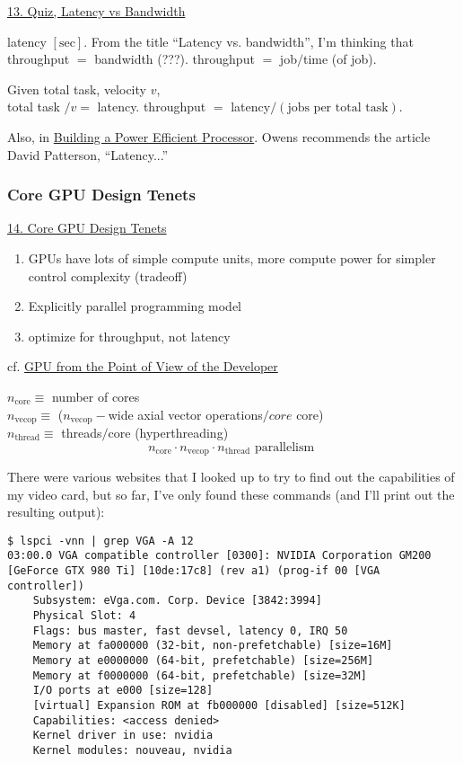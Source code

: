 \documentclass[10pt]{amsart}
\begin{document}
\begin{multicols*}{2}
\href{https://classroom.udacity.com/courses/cs344/lessons/55120467/concepts/667559300923}{13. Quiz, Latency vs Bandwidth}

latency $[\text{sec}]$.  From the title ``Latency vs. bandwidth'', I'm thinking that throughput $=$ bandwidth (???).  throughput $ = $ job$/$time (of job).  

Given total task, velocity $v$, \\
total task $/v = $ latency.  throughput $=$ latency$/(\text{jobs per total task})$.  


Also, in \href{https://classroom.udacity.com/courses/cs344/lessons/55120467/concepts/669874580923}{Building a Power Efficient Processor}.  Owens recommends the article David Patterson, ``Latency...''

\subsubsection{Core GPU Design Tenets}

\href{https://classroom.udacity.com/courses/cs344/lessons/55120467/concepts/671181620923}{14. Core GPU Design Tenets}

\begin{enumerate}
\item GPUs have lots of simple compute units, more compute power for simpler control complexity (tradeoff) 
\item Explicitly parallel programming model
\item optimize for throughput, not latency 
\end{enumerate}




cf. \href{https://classroom.udacity.com/courses/cs344/lessons/55120467/concepts/671181630923}{GPU from the Point of View of the Developer}

$n_{\text{core}} \equiv $ number of cores \\
$n_{\text{vecop}} \equiv$ ($n_{\text{vecop}}-$wide axial vector operations$/core$ core) \\
$n_{\text{thread}} \equiv $ threads$/$core (hyperthreading)
\[
n_{\text{core}} \cdot n_{\text{vecop}} \cdot n_{\text{thread}}  \text{ parallelism  }
\]

There were various websites that I looked up to try to find out the capabilities of my video card, but so far, I've only found these commands (and I'll print out the resulting output):
{\scriptsize
\begin{lstlisting}
$ lspci -vnn | grep VGA -A 12
03:00.0 VGA compatible controller [0300]: NVIDIA Corporation GM200 [GeForce GTX 980 Ti] [10de:17c8] (rev a1) (prog-if 00 [VGA controller])
	Subsystem: eVga.com. Corp. Device [3842:3994]
	Physical Slot: 4
	Flags: bus master, fast devsel, latency 0, IRQ 50
	Memory at fa000000 (32-bit, non-prefetchable) [size=16M]
	Memory at e0000000 (64-bit, prefetchable) [size=256M]
	Memory at f0000000 (64-bit, prefetchable) [size=32M]
	I/O ports at e000 [size=128]
	[virtual] Expansion ROM at fb000000 [disabled] [size=512K]
	Capabilities: <access denied>
	Kernel driver in use: nvidia
	Kernel modules: nouveau, nvidia


\end{lstlisting}}
\end{multicols*}
\end{document}
